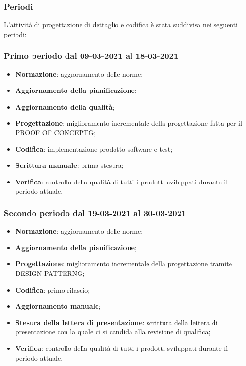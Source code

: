 \documentclass[]{article}
\begin{document}
	\subsubsection{Periodi}
	L’attività di progettazione di dettaglio e codifica è stata suddivisa nei seguenti periodi:
	\subsubsection{Primo periodo dal 09-03-2021 al 18-03-2021}
	\begin{itemize}
		\item \textbf{Normazione}: aggiornamento delle norme;
		\item \textbf{Aggiornamento della pianificazione};
		\item \textbf{Aggiornamento della qualità};
		\item \textbf{Progettazione}: miglioramento incrementale della progettazione fatta per il PROOF OF CONCEPTG;
		\item \textbf{Codifica}: implementazione prodotto software e test;
		\item \textbf{Scrittura manuale}: prima stesura;
		\item \textbf{Verifica}: controllo della qualità di tutti i prodotti sviluppati durante il periodo attuale.
	\end{itemize}

	\subsubsection{Secondo periodo dal 19-03-2021 al 30-03-2021}
	\begin{itemize}
	\item \textbf{Normazione}: aggiornamento delle norme;
	\item \textbf{Aggiornamento della pianificazione};
	\item \textbf{Progettazione}: miglioramento incrementale della progettazione tramite DESIGN PATTERNG;
	\item \textbf{Codifica}: primo rilascio;
	\item \textbf{Aggiornamento manuale};
	\item \textbf{Stesura della lettera di presentazione}: scrittura della lettera di presentazione con la quale ci
	si candida alla revisione di qualifica;
	\item \textbf{Verifica}: controllo della qualità di tutti i prodotti sviluppati durante il periodo attuale.
	\end{itemize}
\end{document}
